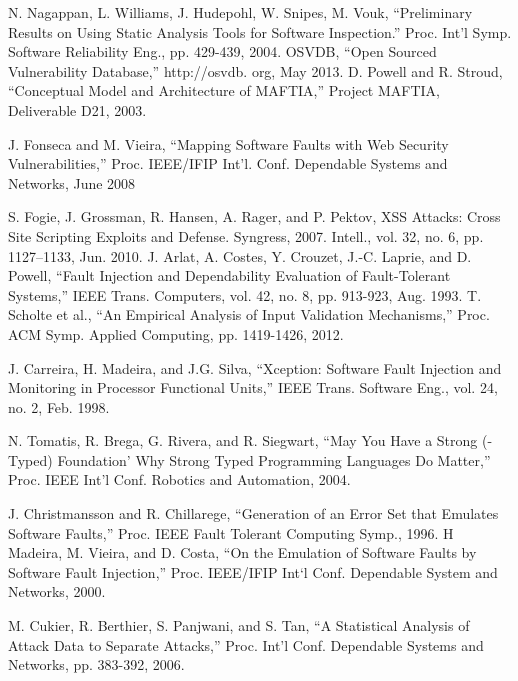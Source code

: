 \documentclass[12pt,a4paper]{report}
\begin{document}
\begin{thebibliography}{8}
N. Nagappan, L. Williams, J. Hudepohl, W. Snipes, M. Vouk,
 ``Preliminary Results on Using Static Analysis Tools for Software
Inspection.'' Proc. Int’l Symp. Software Reliability Eng., pp. 429-439,
2004.
OSVDB,  ``Open Sourced Vulnerability Database,'' http://osvdb.
org, May 2013.
D. Powell and R. Stroud,  ``Conceptual Model and Architecture of
MAFTIA,'' Project MAFTIA, Deliverable D21, 2003.

J. Fonseca and M. Vieira,  ``Mapping Software Faults with Web
Security Vulnerabilities,'' Proc. IEEE/IFIP Int’l. Conf. Dependable
Systems and Networks, June 2008

S. Fogie, J. Grossman, R. Hansen, A. Rager, and P. Pektov, XSS
Attacks: Cross Site Scripting Exploits and Defense. Syngress, 2007.
Intell., vol. 32, no. 6, pp. 1127–1133, Jun. 2010.
J. Arlat, A. Costes, Y. Crouzet, J.-C. Laprie, and D. Powell,  ``Fault
Injection and Dependability Evaluation of Fault-Tolerant Systems,'' IEEE Trans. Computers, vol. 42, no. 8, pp. 913-923, Aug.
1993.
T. Scholte et al.,  ``An Empirical Analysis of Input Validation
Mechanisms,'' Proc. ACM Symp. Applied Computing, pp. 1419-1426,
2012.

J. Carreira, H. Madeira, and J.G. Silva,  ``Xception: Software Fault
Injection and Monitoring in Processor Functional Units,'' IEEE
Trans. Software Eng., vol. 24, no. 2, Feb. 1998.

 N. Tomatis, R. Brega, G. Rivera, and R. Siegwart,  ``May You Have
 a Strong (-Typed) Foundation’ Why Strong Typed Programming
 Languages Do Matter,'' Proc. IEEE Int’l Conf. Robotics and
 Automation, 2004.
 
J. Christmansson and R. Chillarege,  ``Generation of an Error Set
that Emulates Software Faults,'' Proc. IEEE Fault Tolerant Computing Symp., 1996.
H Madeira, M. Vieira, and D. Costa,  ``On the Emulation of Software Faults by Software Fault Injection,'' Proc. IEEE/IFIP Int‘l
Conf. Dependable System and Networks, 2000.

M. Cukier, R. Berthier, S. Panjwani, and S. Tan,  ``A Statistical
Analysis of Attack Data to Separate Attacks,'' Proc. Int’l Conf.
Dependable Systems and Networks, pp. 383-392, 2006.

\end{thebibliography}
\end{document}
